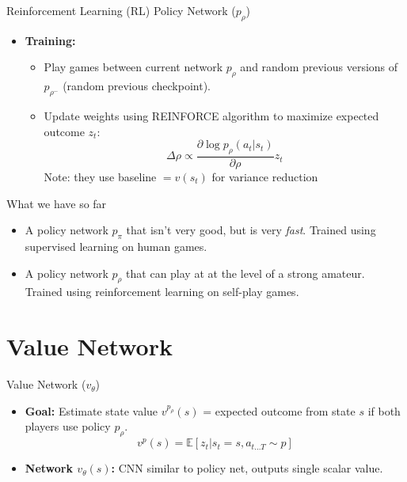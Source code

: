 \documentclass{beamer}
\begin{document}
\begin{frame}{Reinforcement Learning (RL) Policy Network ($p_{\rho}$)}
    \begin{itemize}
        \item \textbf{Training:}
        \vspace{2ex}
        \begin{itemize}
            \item Play games between current network $p_{\rho}$ and random previous versions of $p_{\rho^-}$ (random previous checkpoint).
            \item Update weights using REINFORCE algorithm to maximize expected outcome $z_t$:
            $$ \Delta\rho \propto \frac{\partial \log p_{\rho}(a_t|s_t)}{\partial\rho} z_t $$
            Note: they use baseline $= v(s_t)$ for variance reduction
        \end{itemize}
    \end{itemize}
\end{frame}

\begin{frame}{What we have so far}
    \begin{itemize}
        \item A policy network $p_{\pi}$ that isn't very good, but is very \textit{fast}. Trained using supervised learning on human games.
        \item A policy network $p_{\rho}$ that can play at at the level of a strong amateur. Trained using reinforcement learning on self-play games.
    \end{itemize}
\end{frame}
    
\section{Value Network}
\begin{frame}{Value Network ($v_{\theta}$)}
    \begin{itemize}
        \item \textbf{Goal:} Estimate state value $v^{p_{\rho}}(s)$ = expected outcome from state $s$ if both players use policy $p_{\rho}$.
        $$ v^p(s) = \mathbb{E}[z_t | s_t=s, a_{t...T} \sim p] $$
        \item \textbf{Network $v_{\theta}(s)$:} CNN similar to policy net, outputs single scalar value.
    \end{itemize}
\end{frame}
\end{document}
